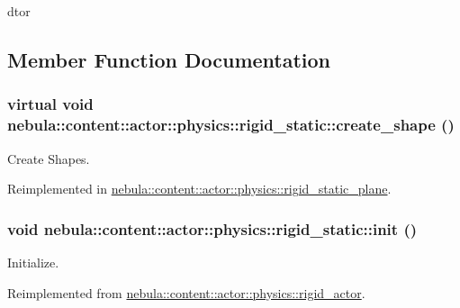 dtor 

\subsection{Member Function Documentation}
\hypertarget{classnebula_1_1content_1_1actor_1_1physics_1_1rigid__static_a0f4319c5cceb75e7d4376b82dba662de}{
\subsubsection[{create\_\-shape}]{\setlength{\rightskip}{0pt plus 5cm}virtual void nebula::content::actor::physics::rigid\_\-static::create\_\-shape ()}}
\label{classnebula_1_1content_1_1actor_1_1physics_1_1rigid__static_a0f4319c5cceb75e7d4376b82dba662de}


Create Shapes. 

Reimplemented in \hyperlink{classnebula_1_1content_1_1actor_1_1physics_1_1rigid__static__plane_ae711cbc9bd080a597efd1a5193756152}{nebula::content::actor::physics::rigid\_\-static\_\-plane}.\hypertarget{classnebula_1_1content_1_1actor_1_1physics_1_1rigid__static_a37aa702d9a31ff9529659343c6155482}{
\subsubsection[{init}]{\setlength{\rightskip}{0pt plus 5cm}void nebula::content::actor::physics::rigid\_\-static::init ()}}
\label{classnebula_1_1content_1_1actor_1_1physics_1_1rigid__static_a37aa702d9a31ff9529659343c6155482}


Initialize. 

Reimplemented from \hyperlink{classnebula_1_1content_1_1actor_1_1physics_1_1rigid__actor_a9c4d9fe73271ad35a646c95fc12b4cde}{nebula::content::actor::physics::rigid\_\-actor}.

